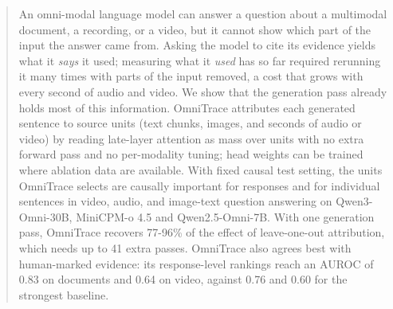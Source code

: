 \begin{abstract}
An omni-modal language model can answer a question about a multimodal document, a recording, or a video, but it cannot show which part of the input the answer came from.
Asking the model to cite its evidence yields what it \emph{says} it used; measuring what it \emph{used} has so far required rerunning it many times with parts of the input removed, a cost that grows with every second of audio and video.
We show that the generation pass already holds most of this information.
OmniTrace attributes each generated sentence to source units (text chunks, images, and seconds of audio or video) by reading late-layer attention as mass over units with no extra forward pass and no per-modality tuning; head weights can be trained where ablation data are available.
With fixed causal test setting, the units OmniTrace selects are causally important for responses and for individual sentences in video, audio, and image-text question answering on Qwen3-Omni-30B, MiniCPM-o 4.5 and Qwen2.5-Omni-7B. With one generation pass, OmniTrace recovers 77-96\% of the effect of leave-one-out attribution, which needs up to 41 extra passes.
OmniTrace also agrees best with human-marked evidence: its response-level rankings reach an AUROC of 0.83 on documents and 0.64 on video, against 0.76 and 0.60 for the strongest baseline.
\end{abstract}
